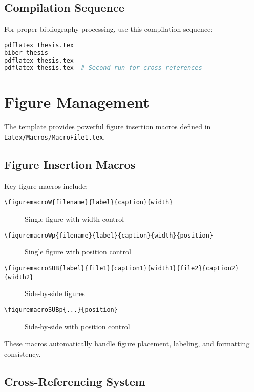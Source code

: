 \subsection{Compilation Sequence}
\label{sect:compilation}

For proper bibliography processing, use this compilation sequence:

\begin{lstlisting}[language=bash,caption={Complete compilation sequence}]
pdflatex thesis.tex
biber thesis
pdflatex thesis.tex
pdflatex thesis.tex  # Second run for cross-references
\end{lstlisting}

\section{Figure Management}
\label{sect:figure-management}

The template provides powerful figure insertion macros defined in \texttt{Latex/Macros/MacroFile1.tex}.

\subsection{Figure Insertion Macros}
\label{sect:figure-macros}

Key figure macros include:

\begin{description}
    \item[\texttt{\textbackslash figuremacroW\{filename\}\{label\}\{caption\}\{width\}}] Single figure with width control
    \item[\texttt{\textbackslash figuremacroWp\{filename\}\{label\}\{caption\}\{width\}\{position\}}] Single figure with position control
    \item[\texttt{\textbackslash figuremacroSUB\{label\}\{file1\}\{caption1\}\{width1\}\{file2\}\{caption2\}\{width2\}}] Side-by-side figures
    \item[\texttt{\textbackslash figuremacroSUBp\{...\}\{position\}}] Side-by-side with position control
\end{description}

These macros automatically handle figure placement, labeling, and formatting consistency.

\subsection{Cross-Referencing System}
\label{sect:cross-ref-system}

